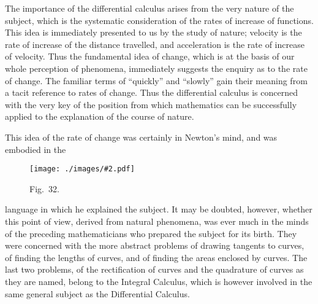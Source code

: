 \documentclass[12pt,leqno]{book}[2005/09/16]
\newcommand{\Graphic}[2]{%
  \phantomsection\label{fig:#2}%
  \texttt{[image: ./images/\#2.pdf]}%
}
\newcommand{\DefWidth}{4in}%
\newcommand{\Figure}[2][\DefWidth]{%
  \begin{figure}[hbt!]
    \centering
    \phantomsection\label{fig:#2}
    \Graphic{#1}{fig#2}
    \caption{Fig.~#2.}
  \end{figure}\ignorespaces%
}
\newcommand{\PageSep}[1]{\ignorespaces}
\begin{document}
The importance of the differential calculus
%
arises from the very nature of the subject,
which is the systematic consideration of the
rates of increase of functions. This idea is
immediately presented to us by the study of
nature; velocity is the rate of increase of the
distance travelled, and acceleration is the
rate of increase of velocity. Thus the fundamental
idea of change, which is at the basis of
our whole perception of phenomena, immediately
suggests the enquiry as to the rate of
change. The familiar terms of ``quickly''
and ``slowly'' gain their meaning from a tacit
\PageSep{221}
reference to rates of change. Thus the differential
calculus is concerned with the very
key of the position from which mathematics
can be successfully applied to the explanation
of the course of nature.

This idea of the rate of change was certainly
in Newton's mind, and was embodied in the
\Figure{32}
language in which he explained the subject.
It may be doubted, however, whether this
point of view, derived from natural phenomena,
was ever much in the minds of the preceding
mathematicians who prepared the subject
for its birth. They were concerned with the
more abstract problems of drawing tangents
%
to curves, of finding the lengths of curves, and
of finding the areas enclosed by curves. The
\PageSep{222}
last two problems, of the rectification of curves
and the quadrature of curves as they are
named, belong to the Integral Calculus, which
%
is however involved in the same general subject
as the Differential Calculus.
\end{document}
